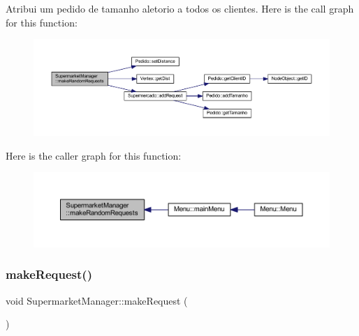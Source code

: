 Atribui um pedido de tamanho aletorio a todos os clientes. Here is the call graph for this function\+:
\nopagebreak
\begin{figure}[H]
\begin{center}
\leavevmode
\includegraphics[width=350pt]{class_supermarket_manager_a6dbf83eef3433341c7a971860e3b8915_cgraph}
\end{center}
\end{figure}
Here is the caller graph for this function\+:
\nopagebreak
\begin{figure}[H]
\begin{center}
\leavevmode
\includegraphics[width=350pt]{class_supermarket_manager_a6dbf83eef3433341c7a971860e3b8915_icgraph}
\end{center}
\end{figure}
\mbox{\label{class_supermarket_manager_a19901c8d338b7579398373aeda62ecf2}} 
\subsubsection{\texorpdfstring{make\+Request()}{makeRequest()}}
{\footnotesize\ttfamily void Supermarket\+Manager\+::make\+Request (\begin{DoxyParamCaption}{ }\end{DoxyParamCaption})}

